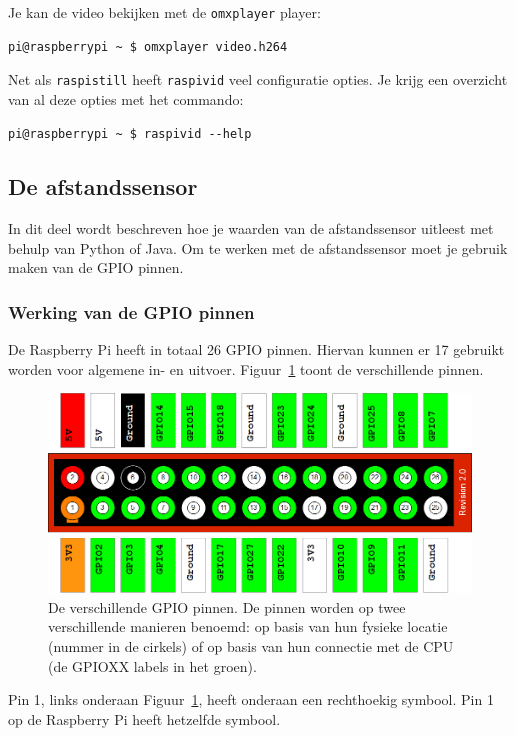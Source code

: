 \documentclass[a4paper]{article}
\begin{document}
      Je kan de video bekijken met de \texttt{omxplayer} player:
\begin{lstlisting}
pi@raspberrypi ~ $ omxplayer video.h264
\end{lstlisting}

      Net als \texttt{raspistill} heeft \texttt{raspivid} veel
configuratie opties.  Je krijg een overzicht van al deze opties met
het commando:
\begin{lstlisting}
pi@raspberrypi ~ $ raspivid --help
\end{lstlisting}

  \subsection{De afstandssensor}

    In dit deel wordt beschreven hoe je waarden van de afstandssensor
uitleest met behulp van Python of Java.  Om te werken met de
afstandssensor moet je gebruik maken van de GPIO pinnen.

    \subsubsection{Werking van de GPIO pinnen}

      De Raspberry Pi heeft in totaal 26 GPIO pinnen.  Hiervan kunnen
er 17 gebruikt worden voor algemene in- en uitvoer.
Figuur~\ref{fig:gpio} toont de verschillende pinnen.

      \begin{figure}[h!]
        \centering
        \includegraphics[width=.8\textwidth]{images/gpio.png}
        \caption{De verschillende GPIO pinnen.  De pinnen worden op
twee verschillende manieren benoemd: op basis van hun fysieke locatie
(nummer in de cirkels) of op basis van hun connectie met de CPU (de
GPIOXX labels in het groen).}
        \label{fig:gpio}
      \end{figure}

      Pin 1, links onderaan Figuur~\ref{fig:gpio}, heeft onderaan een
rechthoekig symbool. Pin 1 op de Raspberry Pi heeft hetzelfde symbool.
\end{document}
